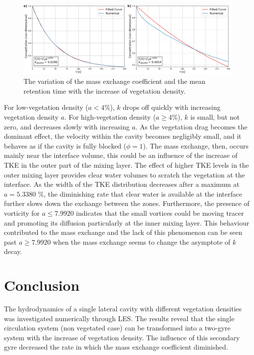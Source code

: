 \begin{figure}[!ht]
\centering
\includegraphics[width=\linewidth]{../images/art4/massDecay.jpeg}
\caption{The variation of the mass exchange coefficient and the mean retention time with the increase of vegetation density.}
\label{fig:art4:massExchange}
\end{figure}

For low-vegetation density ($a < 4$\%), $k$ drops off quickly with increasing vegetation density $a$. For high-vegetation density ($a \geq 4$\%), $k$ is small, but not zero, and decreases slowly with increasing $a$. As the vegetation drag becomes the dominant effect, the velocity within the cavity becomes negligibly small, and it behaves as if the cavity is fully blocked ($\phi = 1$). The mass exchange, then, occurs mainly near the interface volume, this could be an influence of the increase of TKE in the outer part of the mixing layer. The effect of higher TKE levels in the outer mixing layer provides clear water volumes to scratch the vegetation at the interface. As the width of the TKE distribution decreases after a maximum at $a = 5.3380$ \%, the diminishing rate that clear water is available at the interface further slows down the exchange between the zones. Furthermore, the presence of vorticity for $a \leq 7.9920$ indicates that the small vortices could be moving tracer and promoting its diffusion particularly at the inner mixing layer. This behaviour contributed to the mass exchange and the lack of this phenomenon can be seen past $a \geq 7.9920$ when the mass exchange seems to change the asymptote of $k$ decay.

\section{Conclusion}
The hydrodynamics of a single lateral cavity with different vegetation densities was investigated numerically through LES. The results reveal that the single circulation system (non vegetated case) can be transformed into a two-gyre system with the increase of vegetation density. The influence of this secondary gyre decreased the rate in which the mass exchange coefficient diminished.

